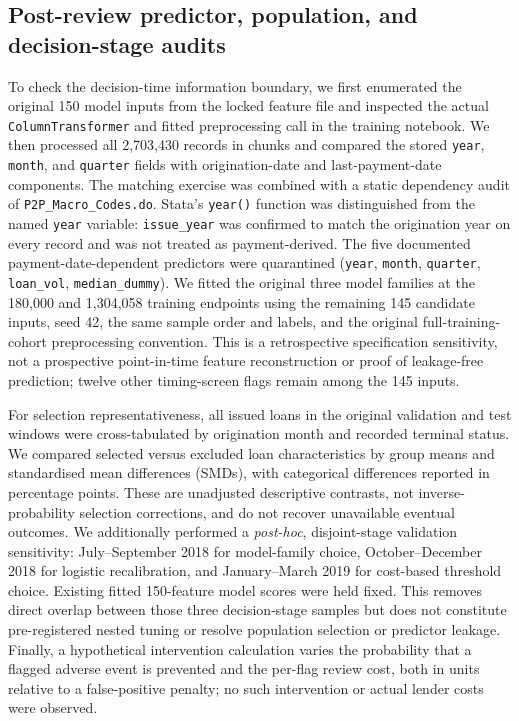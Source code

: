 \documentclass[10pt]{article}
\begin{document}
\subsection{Post-review predictor, population, and decision-stage audits}
\label{sec:additionalmethods}
To check the decision-time information boundary, we first enumerated the original 150 model inputs from the locked feature file and inspected the actual \texttt{ColumnTransformer} and fitted preprocessing call in the training notebook. We then processed all 2,703,430 records in chunks and compared the stored \texttt{year}, \texttt{month}, and \texttt{quarter} fields with origination-date and last-payment-date components. The matching exercise was combined with a static dependency audit of \texttt{P2P\_Macro\_Codes.do}. Stata's \texttt{year()} function was distinguished from the named \texttt{year} variable: \texttt{issue\_year} was confirmed to match the origination year on every record and was not treated as payment-derived. The five documented payment-date-dependent predictors were quarantined (\texttt{year}, \texttt{month}, \texttt{quarter}, \texttt{loan\_vol}, \texttt{median\_dummy}). We fitted the original three model families at the 180,000 and 1,304,058 training endpoints using the remaining 145 candidate inputs, seed 42, the same sample order and labels, and the original full-training-cohort preprocessing convention. This is a retrospective specification sensitivity, not a prospective point-in-time feature reconstruction or proof of leakage-free prediction; twelve other timing-screen flags remain among the 145 inputs.

For selection representativeness, all issued loans in the original validation and test windows were cross-tabulated by origination month and recorded terminal status. We compared selected versus excluded loan characteristics by group means and standardised mean differences (SMDs), with categorical differences reported in percentage points. These are unadjusted descriptive contrasts, not inverse-probability selection corrections, and do not recover unavailable eventual outcomes. We additionally performed a \emph{post-hoc}, disjoint-stage validation sensitivity: July--September 2018 for model-family choice, October--December 2018 for logistic recalibration, and January--March 2019 for cost-based threshold choice. Existing fitted 150-feature model scores were held fixed. This removes direct overlap between those three decision-stage samples but does not constitute pre-registered nested tuning or resolve population selection or predictor leakage. Finally, a hypothetical intervention calculation varies the probability that a flagged adverse event is prevented and the per-flag review cost, both in units relative to a false-positive penalty; no such intervention or actual lender costs were observed.
\end{document}
